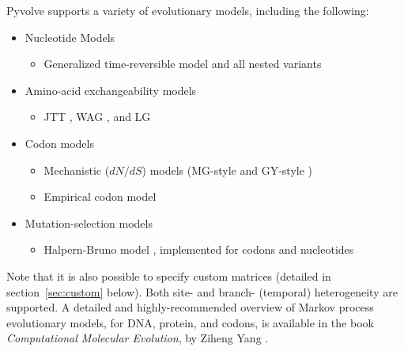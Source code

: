 \documentclass{article}
\begin{document}
Pyvolve supports a variety of evolutionary models, including the following:
\begin{itemize}
	\item Nucleotide Models 
	\begin{itemize}
		\item Generalized time-reversible model \cite{GTR} and all nested variants
	\end{itemize}
	\item Amino-acid exchangeability models 
	\begin{itemize}
		\item JTT \cite{JTT}, WAG \cite{WAG}, and LG \cite{LG}
	\end{itemize}
	\item Codon models
	\begin{itemize}
		\item Mechanistic ($dN/dS$) models (MG-style \cite{MG94} and GY-style \cite{GY94})
		\item Empirical codon model \cite{ECM}
	\end{itemize}
	\item Mutation-selection models
	\begin{itemize}
		\item Halpern-Bruno model \cite{HB98}, implemented for codons and nucleotides
	\end{itemize}
\end{itemize}
Note that it is also possible to specify custom matrices (detailed in section~\ref{sec:custom} below). Both site- and branch- (temporal) heterogeneity are supported. A detailed and highly-recommended overview of Markov process evolutionary models, for DNA, protein, and codons, is available in the book \emph{Computational Molecular Evolution}, by Ziheng Yang \citep{Yang2006}.
\end{document}

